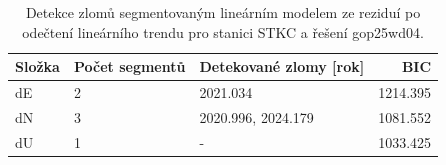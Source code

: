\begin{table}[htbp]
\caption{Detekce zlomů segmentovaným lineárním modelem ze reziduí po odečtení lineárního trendu pro stanici STKC a řešení gop25wd04.}
\label{tab:gop25wd04_stcd_stkc_detr_weighted_1seg_jumps_piecewise_bic}
\begin{tabular}{lllr}
\toprule
Složka & Počet segmentů & Detekované zlomy [rok] & BIC \\
\midrule
dE & 2 & 2021.034 & 1214.395 \\
dN & 3 & 2020.996, 2024.179 & 1081.552 \\
dU & 1 & - & 1033.425 \\
\bottomrule
\end{tabular}
\end{table}

